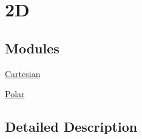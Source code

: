 \hypertarget{group___e_g_x_math-_conversions-_coordinate_conversions-2_d}{}\section{2D}
\label{group___e_g_x_math-_conversions-_coordinate_conversions-2_d}
\subsection*{Modules}
\begin{DoxyCompactItemize}
\item 
\mbox{\hyperlink{group___e_g_x_math-_conversions-_coordinate_conversions-2_d-_cartesian}{Cartesian}}
\item 
\mbox{\hyperlink{group___e_g_x_math-_conversions-_coordinate_conversions-2_d-_polar}{Polar}}
\end{DoxyCompactItemize}


\subsection{Detailed Description}
